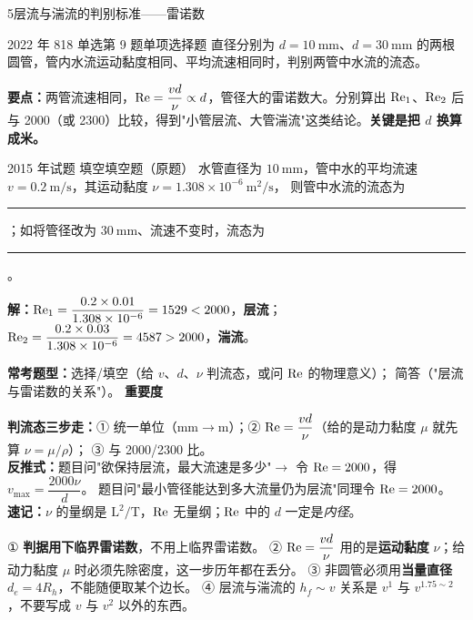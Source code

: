 \begin{kaodian}{5}{层流与湍流的判别标准——雷诺数}
\begin{zhenti}{2022 年 818 单选第 9 题}{单项选择题}
直径分别为 $d=10\ \mathrm{mm}$、$d=30\ \mathrm{mm}$ 的两根圆管，管内水流运动黏度相同、平均流速相同时，判别两管中水流的流态。
\end{zhenti}
\noindent\textbf{要点：}两管流速相同，$\mathrm{Re}=\dfrac{vd}{\nu}\propto d$，管径大的雷诺数大。分别算出 $\mathrm{Re}_1$、$\mathrm{Re}_2$ 后与 2000（或 2300）比较，得到"小管层流、大管湍流"这类结论。\textbf{关键是把 $d$ 换算成米。}

\begin{zhenti}{2015 年试题 填空}{填空题（原题）}
水管直径为 $10\ \mathrm{mm}$，管中水的平均流速 $v=0.2\ \mathrm{m/s}$，其运动黏度 $\nu=1.308\times10^{-6}\ \mathrm{m^2/s}$，
则管中水流的流态为\rule{2cm}{0.4pt}；如将管径改为 $30\ \mathrm{mm}$、流速不变时，流态为\rule{2cm}{0.4pt}。
\end{zhenti}
\noindent\textbf{解：}$\mathrm{Re}_1=\dfrac{0.2\times0.01}{1.308\times10^{-6}}=1529<2000$，\textbf{层流}；
$\mathrm{Re}_2=\dfrac{0.2\times0.03}{1.308\times10^{-6}}=4587>2000$，\textbf{湍流}。

\textbf{常考题型：}选择/填空（给 $v$、$d$、$\nu$ 判流态，或问 $\mathrm{Re}$ 的物理意义）；
简答（"层流与雷诺数的关系"）。
\textbf{重要度 }\quad{}\quad{}

\begin{banfa}
\textbf{判流态三步走：}① 统一单位（mm$\to$m）；② $\mathrm{Re}=\dfrac{vd}{\nu}$（给的是动力黏度 $\mu$ 就先算 $\nu=\mu/\rho$）；
③ 与 2000/2300 比。\\
\textbf{反推式：}题目问"欲保持层流，最大流速是多少"$\to$ 令 $\mathrm{Re}=2000$，得 $v_{\max}=\dfrac{2000\nu}{d}$。
题目问"最小管径能达到多大流量仍为层流"同理令 $\mathrm{Re}=2000$。\\
\textbf{速记：}$\nu$ 的量纲是 $\mathrm{L^2/T}$，$\mathrm{Re}$ 无量纲；$\mathrm{Re}$ 中的 $d$ 一定是\emph{内径}。
\end{banfa}

\begin{yicuo}
① \textbf{判据用下临界雷诺数}，不用上临界雷诺数。
② $\mathrm{Re}=\dfrac{vd}{\nu}$ 用的是\textbf{运动黏度} $\nu$；给动力黏度 $\mu$ 时必须先除密度，这一步历年都在丢分。
③ 非圆管必须用\textbf{当量直径} $d_e=4R_h$，不能随便取某个边长。
④ 层流与湍流的 $h_f\sim v$ 关系是 $v^1$ 与 $v^{1.75\sim2}$，不要写成 $v$ 与 $v^2$ 以外的东西。
\end{yicuo}
\end{kaodian}

